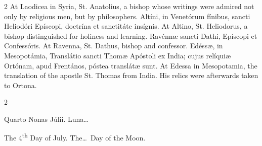 \begin{paracol}{2}
At Laodicea in Syria, St. Anatolius, 
 a bishop whose writings were admired not only by religious men, but by 
 philosophers.
\switchcolumn*
{}
Altíni, in Venetórum 
 fínibus, sancti Heliodóri Epíscopi, doctrína et sanctitáte insígnis.
\switchcolumn
{}
At Altino, St. Heliodorus, a bishop 
 distinguished for holiness and learning.
\switchcolumn*
{}
Ravénnæ sancti Dathi, 
 Epíscopi et Confessóris.
\switchcolumn
{}
At Ravenna, St. Dathus, bishop and 
 confessor.
\switchcolumn*
{}
Edéssæ, in Mesopotámia, Translátio sancti Thomæ Apóstoli ex India; cujus relíquiæ Ortónam, apud 
 Frentános, póstea translátæ sunt.
\switchcolumn
{}
At Edessa in Mesopotamia, the 
 translation of the apostle St. Thomas from India. His relics were 
 afterwards taken to Ortona.
\switchcolumn*
{}
\end{paracol}


\begin{paracol}{2}
\begin{center}{\color{gregoriocolor} Quarto Nonas Júlii. 
 Luna\dots\ }\end{center}
\switchcolumn
{}
\begin{center}{\color{gregoriocolor} The 
 4\textsuperscript{th} Day of 
 July. The\dots\ Day of the Moon.}\end{center}
\end{paracol}


